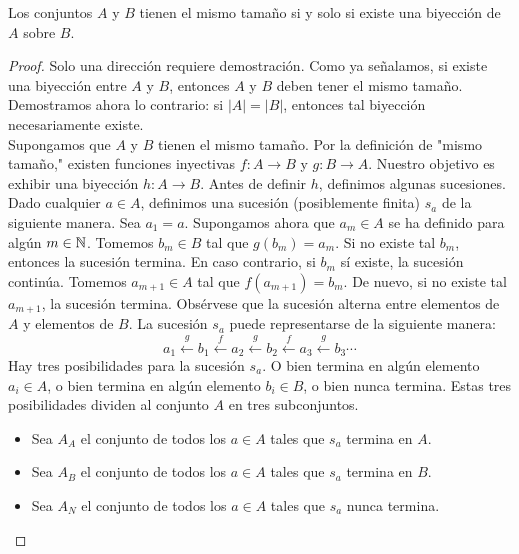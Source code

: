 \documentclass[12pt,a4paper]{book}
\newcommand{\comillas}[1]{"#1"}
\begin{document}
    \begin{teorema}\label{thm:cantor-bernstein}
        Los conjuntos $A$ y $B$ tienen el mismo tamaño si y solo si existe una biyección de $A$ sobre $B$.
    \end{teorema}
    \begin{proof}
        Solo una dirección requiere demostración. Como ya señalamos, si existe una biyección entre $A$ y $B$, entonces $A$
        y $B$ deben tener el mismo tamaño. Demostramos ahora lo contrario: si $|A|=|B|$, entonces tal biyección
        necesariamente existe.\\
        Supongamos que $A$ y $B$ tienen el mismo tamaño. Por la definición de \comillas{mismo tamaño,} existen funciones
        inyectivas $f:A\rightarrow B$ y $g:B\rightarrow A$. Nuestro objetivo es exhibir una biyección $h:A\rightarrow B$.
        Antes de definir $h$, definimos algunas sucesiones.\\
        Dado cualquier $a\in A$, definimos una sucesión (posiblemente finita) $s_{a}$ de la siguiente manera. Sea $a_{1}=a$.
        Supongamos ahora que $a_{m}\in A$ se ha definido para algún $m\in\mathbb{N}$. Tomemos $b_{m}\in B$ tal que $g(b_{m})=a_{m}$.
        Si no existe tal $b_{m}$, entonces la sucesión termina. En caso contrario, si $b_{m}$ sí existe, la sucesión
        continúa. Tomemos $a_{m+1}\in A$ tal que $f(a_{m+1})=b_{m}$. De nuevo, si no existe tal $a_{m+1}$, la sucesión
        termina. Obsérvese que la sucesión alterna entre elementos de $A$ y elementos de $B$. La sucesión $s_{a}$ puede
        representarse de la siguiente manera:
        \begin{equation*}
            a_{1}\xleftarrow{g}b_{1}\xleftarrow{f}a_{2}\xleftarrow{g}b_{2}\xleftarrow{f}a_{3}\xleftarrow{g}b_{3}\cdots
        \end{equation*}
        Hay tres posibilidades para la sucesión $s_{a}$. O bien termina en algún elemento $a_{i}\in A$, o bien termina en
        algún elemento $b_{i}\in B$, o bien nunca termina. Estas tres posibilidades dividen al conjunto $A$ en tres
        subconjuntos.

        \begin{itemize}
            \item[$\bullet$] Sea $A_{A}$ el conjunto de todos los $a\in A$ tales que $s_{a}$ termina en $A$.
            \item[$\bullet$] Sea $A_{B}$ el conjunto de todos los $a\in A$ tales que $s_{a}$ termina en $B$.
            \item[$\bullet$] Sea $A_{N}$ el conjunto de todos los $a\in A$ tales que $s_{a}$ nunca termina.
        \end{itemize}


\end{proof}
\end{document}
